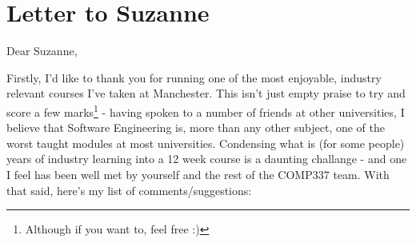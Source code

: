 \section{Letter to Suzanne}
\label{sec:Letter to Suzanne}

Dear Suzanne,


Firstly, I'd like to thank you for running one of the most enjoyable,
industry relevant courses I've taken at Manchester. This isn't just empty
praise to try and score a few marks\footnote{Although if you want to, feel free :)}
- having spoken to a number of friends at other universities, I believe that
Software Engineering is, more than any other subject, one of the worst taught
modules at most universities. Condensing what is (for some people) years of
industry learning into a 12 week course is a daunting challange - and one I feel
has been well met by yourself and the rest of the COMP337 team. With that said,
here's my list of comments/suggestions:

